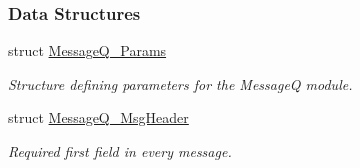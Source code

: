 \subsubsection*{Data Structures}
\begin{DoxyCompactItemize}
\item 
struct \hyperlink{struct_message_q___params}{Message\-Q\-\_\-\-Params}
\begin{DoxyCompactList}\small\item\em Structure defining parameters for the Message\-Q module. \end{DoxyCompactList}\item 
struct \hyperlink{struct_message_q___msg_header}{Message\-Q\-\_\-\-Msg\-Header}
\begin{DoxyCompactList}\small\item\em Required first field in every message. \end{DoxyCompactList}\end{DoxyCompactItemize}
